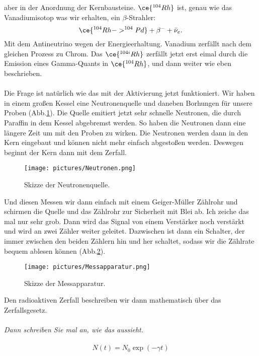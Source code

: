 aber in der Anordnung der Kernbausteine. $\ce{^{104}Rh}$ ist, genau wie das Vanadiumisotop was wir erhalten, ein $\beta$-Strahler: 
\begin{equation}
    \ce{^{104}Rh -> ^{104}Pd}+\beta^-+\bar{\nu}_e. 
\end{equation}
Mit dem Antineutrino wegen der Energieerhaltung. Vanadium zerfällt nach dem gleichen Prozess zu Chrom. 
Das $\ce{^{104i}Rh}$ zerfällt jetzt erst eimal durch die Emission eines Gamma-Quants in $\ce{^{104}Rh}$, und dann weiter wie eben beschrieben. 
\\\\\noindent
Die Frage ist natürlich wie das mit der Aktivierung jetzt funktioniert. Wir haben in einem großen Kessel eine Neutronenquelle und daneben
Borhungen für unsere Proben (Abb.\ref{fig:Kessel}). Die Quelle emitiert jetzt sehr schnelle Neutronen, die durch Paraffin in dem Kessel abgebremst
werden. So haben die Neutronen dann eine längere Zeit um mit den Proben zu wirken. Die Neutronen werden dann in den Kern eingebaut und können
nicht mehr einfach abgestoßen werden. Deswegen beginnt der Kern dann mit dem Zerfall. 
\begin{figure}[H]
    \centering
    \texttt{[image: pictures/Neutronen.png]}
    \caption{Skizze der Neutronenquelle. \cite{AP04}}
    \label{fig:Kessel}
  \end{figure}
\noindent
Und diesen Messen wir dann einfach mit einem Geiger-Müller 
Zählrohr und schirmen die Quelle und das Zählrohr zur Sicherheit mit Blei ab. Ich zeiche das mal nur sehr grob. Dann wird das Signal von
einem Verstärker noch verstärkt und wird an zwei Zähler weiter geleitet. Dazwischen ist dann ein Schalter, der immer zwischen den beiden Zählern
hin und her schaltet, sodass wir die Zählrate bequem ablesen können (Abb.\ref{fig:Apparatur}). 
\begin{figure}[H]
    \centering
    \texttt{[image: pictures/Messapparatur.png]}
    \caption{Skizze der Messapparatur. \cite{AP04}}
    \label{fig:Apparatur}
  \end{figure}
\noindent
Den radioaktiven Zerfall beschreiben wir dann mathematisch über das Zerfallsgesetz. 
\\\\\noindent
\textit{Dann schreiben Sie mal an, wie das aussieht.}
\\\\\noindent
\begin{equation}
    N(t)=N_0\exp(-\gamma t)
\end{equation}
